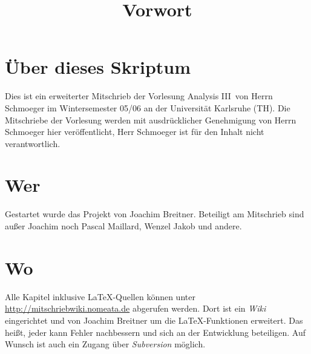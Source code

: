 \documentclass{article}
\title{Vorwort}
\begin{document}
\maketitle

\section{Über dieses Skriptum}
Dies ist ein erweiterter Mitschrieb der Vorlesung \glqq Analysis III\grqq\ von Herrn Schmoeger im
Wintersemester 05/06 an der Universität Karlsruhe (TH). Die Mitschriebe der Vorlesung werden mit
ausdrücklicher Genehmigung von Herrn Schmoeger hier veröffentlicht, Herr Schmoeger ist für den
Inhalt nicht verantwortlich.

\section{Wer}
Gestartet wurde das Projekt von Joachim Breitner. Beteiligt am Mitschrieb sind außer Joachim
noch Pascal Maillard, Wenzel Jakob und andere.

\section{Wo}
Alle Kapitel inklusive \LaTeX-Quellen können unter \url{http://mitschriebwiki.nomeata.de} abgerufen werden.
Dort ist ein \emph{Wiki} eingerichtet und von Joachim Breitner um die \LaTeX-Funktionen erweitert.
Das heißt, jeder kann Fehler nachbessern und sich an der Entwicklung
beteiligen. Auf Wunsch ist auch ein Zugang über \emph{Subversion} möglich.
\end{document}
